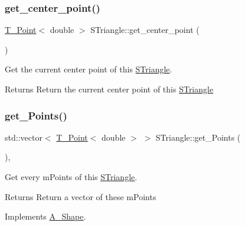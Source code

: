 \mbox{\label{classSTriangle_a61228a7f80ee90de80dff8c4e046f51f}} 
\subsubsection{\texorpdfstring{get\+\_\+center\+\_\+point()}{get\_center\_point()}}
{\footnotesize\ttfamily \hyperlink{classPoint}{T_Point}$<$ double $>$ S\+Triangle\+::get\+\_\+center\+\_\+point (\begin{DoxyParamCaption}{ }\end{DoxyParamCaption})}



Get the current center point of this \hyperlink{classSTriangle}{S\+Triangle}. 

\begin{DoxyReturn}{Returns}
Return the current center point of this \hyperlink{classSTriangle}{S\+Triangle} 
\end{DoxyReturn}
\mbox{\label{classSTriangle_a08f667453619b506b5c16745a9aa5ecf}} 
\subsubsection{\texorpdfstring{get\+\_\+\+Points()}{get\_Points()}}
{\footnotesize\ttfamily std\+::vector$<$ \hyperlink{classPoint}{T_Point}$<$ double $>$ $>$ S\+Triangle\+::get\+\_\+\+Points (\begin{DoxyParamCaption}{ }\end{DoxyParamCaption})\hspace{0.3cm}{\ttfamily [override]}, {\ttfamily [virtual]}}



Get every mPoints of this \hyperlink{classSTriangle}{S\+Triangle}.

\begin{DoxyReturn}{Returns}
Return a vector of these mPoints
\end{DoxyReturn}


Implements \hyperlink{classShape_add74a5c682840fa4a519242b1ddbd0b5}{A_Shape}.

\mbox{\label{classSTriangle_a5b55df6eb4af922521da69f69df77b42}} 
